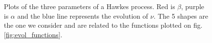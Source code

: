 \begin{figure}
\centering
{}
\\
\\
\caption{Plots of the three parameters of a Hawkes process. Red is $\beta$, purple is $\alpha$ and the blue line represents the evolution of $\nu$. The 5 shapes are the one we consider and are related to the functions plotted on fig. \ref{fig:evol_functions}.}
\label{fig:evol_functions_interact}
\end{figure}













